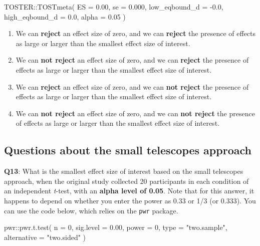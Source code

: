 \documentclass[
  oneside]{krantz}
\makeatletter
\newenvironment{Shaded}{\begin{snugshade}}{\end{snugshade}}
\newcommand{\AttributeTok}[1]{\textcolor[rgb]{0.61,0.61,0.61}{#1}}
\newcommand{\DecValTok}[1]{\textcolor[rgb]{0.06,0.06,0.06}{#1}}
\newcommand{\FloatTok}[1]{\textcolor[rgb]{0.06,0.06,0.06}{#1}}
\newcommand{\FunctionTok}[1]{\textcolor[rgb]{0,0,0}{#1}}
\newcommand{\NormalTok}[1]{#1}
\newcommand{\SpecialCharTok}[1]{\textcolor[rgb]{0,0,0}{#1}}
\newcommand{\StringTok}[1]{\textcolor[rgb]{0.5,0.5,0.5}{#1}}
\providecommand{\tightlist}{%
  \setlength{\itemsep}{0pt}\setlength{\parskip}{0pt}}
\newenvironment{kframe}{%
\medskip{}
\setlength{\fboxsep}{.8em}
 \def\at@end@of@kframe{}%
 \ifinner\ifhmode%
  \def\at@end@of@kframe{\end{minipage}}%
  \begin{minipage}{\columnwidth}%
 \fi\fi%
 \def\FrameCommand##1{\hskip\@totalleftmargin \hskip-\fboxsep
 \colorbox{shadecolor}{##1}\hskip-\fboxsep
     \hskip-\linewidth \hskip-\@totalleftmargin \hskip\columnwidth}%
 \MakeFramed {\advance\hsize-\width
   \@totalleftmargin\z@ \linewidth\hsize
   \@setminipage}}%
 {\par\unskip\endMakeFramed%
 \at@end@of@kframe}
\renewenvironment{Shaded}{\begin{kframe}}{\end{kframe}}
\makeatother
\begin{document}
\begin{Shaded}
\begin{Highlighting}[]
\NormalTok{TOSTER}\SpecialCharTok{::}\FunctionTok{TOSTmeta}\NormalTok{(}
  \AttributeTok{ES =} \FloatTok{0.00}\NormalTok{,}
  \AttributeTok{se =} \FloatTok{0.000}\NormalTok{,}
  \AttributeTok{low\_eqbound\_d =} \SpecialCharTok{{-}}\FloatTok{0.0}\NormalTok{,}
  \AttributeTok{high\_eqbound\_d =} \FloatTok{0.0}\NormalTok{,}
  \AttributeTok{alpha =} \FloatTok{0.05}
\NormalTok{)}
\end{Highlighting}
\end{Shaded}

\begin{enumerate}
\def\labelenumi{\Alph{enumi})}
\tightlist
\item
  We can \textbf{reject} an effect size of zero, and we can \textbf{reject} the presence of effects as large or larger than the smallest effect size of interest.
\item
  We can \textbf{not reject} an effect size of zero, and we can \textbf{reject} the presence of effects as large or larger than the smallest effect size of interest.
\item
  We can \textbf{reject} an effect size of zero, and we can \textbf{not reject} the presence of effects as large or larger than the smallest effect size of interest.
\item
  We can \textbf{not reject} an effect size of zero, and we can \textbf{not reject} the presence of effects as large or larger than the smallest effect size of interest.
\end{enumerate}

\hypertarget{questions-about-the-small-telescopes-approach}{%
\subsection{Questions about the small telescopes approach}\label{questions-about-the-small-telescopes-approach}}

\textbf{Q13}: What is the smallest effect size of interest based on the small telescopes approach, when the original study collected 20 participants in each condition of an independent \emph{t}-test, with an \textbf{alpha level of 0.05}. Note that for this answer, it happens to depend on whether you enter the power as 0.33 or 1/3 (or 0.333). You can use the code below, which relies on the \texttt{pwr} package.

\begin{Shaded}
\begin{Highlighting}[]
\NormalTok{pwr}\SpecialCharTok{::}\FunctionTok{pwr.t.test}\NormalTok{(}
  \AttributeTok{n =} \DecValTok{0}\NormalTok{, }
  \AttributeTok{sig.level =} \FloatTok{0.00}\NormalTok{, }
  \AttributeTok{power =} \DecValTok{0}\NormalTok{, }
  \AttributeTok{type =} \StringTok{"two.sample"}\NormalTok{,}
  \AttributeTok{alternative =} \StringTok{"two.sided"}
\NormalTok{)}
\end{Highlighting}
\end{Shaded}
\end{document}
